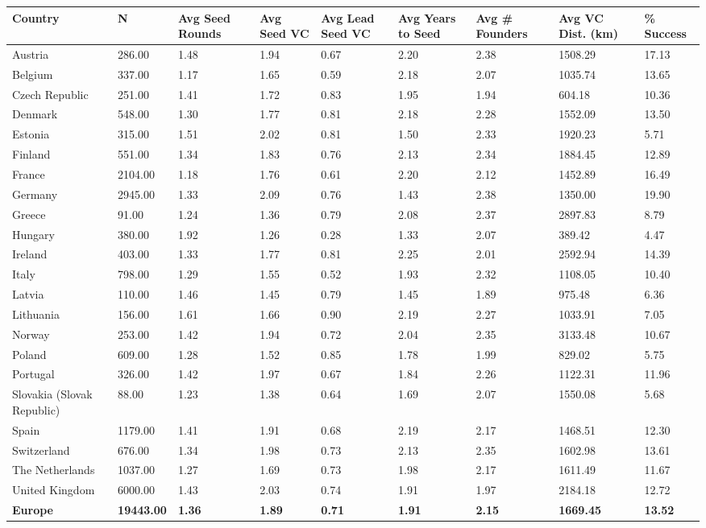 \begin{table}[ht]
\centering
\begin{tabular}{lllllllll}
  \toprule
Country & N & Avg Seed Rounds & Avg Seed VC & Avg Lead Seed VC & Avg Years to Seed & Avg \# Founders & Avg VC Dist. (km) & \% Success \\ 
  \midrule
Austria & 286.00 & 1.48 & 1.94 & 0.67 & 2.20 & 2.38 & 1508.29 & 17.13 \\ 
  Belgium & 337.00 & 1.17 & 1.65 & 0.59 & 2.18 & 2.07 & 1035.74 & 13.65 \\ 
  Czech Republic & 251.00 & 1.41 & 1.72 & 0.83 & 1.95 & 1.94 & 604.18 & 10.36 \\ 
  Denmark & 548.00 & 1.30 & 1.77 & 0.81 & 2.18 & 2.28 & 1552.09 & 13.50 \\ 
  Estonia & 315.00 & 1.51 & 2.02 & 0.81 & 1.50 & 2.33 & 1920.23 & 5.71 \\ 
  Finland & 551.00 & 1.34 & 1.83 & 0.76 & 2.13 & 2.34 & 1884.45 & 12.89 \\ 
  France & 2104.00 & 1.18 & 1.76 & 0.61 & 2.20 & 2.12 & 1452.89 & 16.49 \\ 
  Germany & 2945.00 & 1.33 & 2.09 & 0.76 & 1.43 & 2.38 & 1350.00 & 19.90 \\ 
  Greece & 91.00 & 1.24 & 1.36 & 0.79 & 2.08 & 2.37 & 2897.83 & 8.79 \\ 
  Hungary & 380.00 & 1.92 & 1.26 & 0.28 & 1.33 & 2.07 & 389.42 & 4.47 \\ 
  Ireland & 403.00 & 1.33 & 1.77 & 0.81 & 2.25 & 2.01 & 2592.94 & 14.39 \\ 
  Italy & 798.00 & 1.29 & 1.55 & 0.52 & 1.93 & 2.32 & 1108.05 & 10.40 \\ 
  Latvia & 110.00 & 1.46 & 1.45 & 0.79 & 1.45 & 1.89 & 975.48 & 6.36 \\ 
  Lithuania & 156.00 & 1.61 & 1.66 & 0.90 & 2.19 & 2.27 & 1033.91 & 7.05 \\ 
  Norway & 253.00 & 1.42 & 1.94 & 0.72 & 2.04 & 2.35 & 3133.48 & 10.67 \\ 
  Poland & 609.00 & 1.28 & 1.52 & 0.85 & 1.78 & 1.99 & 829.02 & 5.75 \\ 
  Portugal & 326.00 & 1.42 & 1.97 & 0.67 & 1.84 & 2.26 & 1122.31 & 11.96 \\ 
  Slovakia (Slovak Republic) & 88.00 & 1.23 & 1.38 & 0.64 & 1.69 & 2.07 & 1550.08 & 5.68 \\ 
  Spain & 1179.00 & 1.41 & 1.91 & 0.68 & 2.19 & 2.17 & 1468.51 & 12.30 \\ 
  Switzerland & 676.00 & 1.34 & 1.98 & 0.73 & 2.13 & 2.35 & 1602.98 & 13.61 \\ 
  The Netherlands & 1037.00 & 1.27 & 1.69 & 0.73 & 1.98 & 2.17 & 1611.49 & 11.67 \\ 
  United Kingdom & 6000.00 & 1.43 & 2.03 & 0.74 & 1.91 & 1.97 & 2184.18 & 12.72 \\ 
  \textbf{Europe} & \textbf{19443.00} & \textbf{1.36} & \textbf{1.89} & \textbf{0.71} & \textbf{1.91} & \textbf{2.15} & \textbf{1669.45} & \textbf{13.52} \\ 
   \bottomrule
\end{tabular}
\label{tab:seed_summary_clean}
\end{table}
